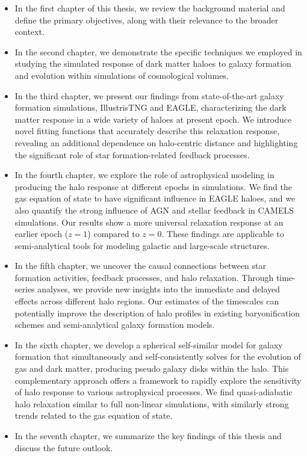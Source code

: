\begin{itemize}
    \item In the first chapter of this thesis, we review the background material and define the primary objectives, along with their relevance to the broader context.
    
    \item In the second chapter, we demonstrate the specific techniques we employed in studying the simulated response of dark matter haloes to galaxy formation and evolution within simulations of cosmological volumes.
    
    \item In the third chapter, we present our findings from state-of-the-art galaxy formation simulations, IllustrisTNG and EAGLE, characterizing the dark matter response in a wide variety of haloes at present epoch. We introduce novel fitting functions that accurately describe this relaxation response, revealing an additional dependence on halo-centric distance and highlighting the significant role of star formation-related feedback processes.
    
    \item In the fourth chapter, we explore the role of astrophysical modeling in producing the halo response at different epochs in simulations. We find the gas equation of state to have significant influence in EAGLE haloes, and we also quantify the strong influence of AGN and stellar feedback in CAMELS simulations. Our results show a more universal relaxation response at an earlier epoch ($z=1$) compared to $z=0$. These findings are applicable to semi-analytical tools for modeling galactic and large-scale structures.
    
    \item In the fifth chapter, we uncover the causal connections between star formation activities, feedback processes, and halo relaxation. Through time-series analyses, we provide new insights into the immediate and delayed effects across different halo regions. Our estimates of the timescales can potentially improve the description of halo profiles in existing baryonification schemes and semi-analytical galaxy formation models.

    \item In the sixth chapter, we develop a spherical self-similar model for galaxy formation that simultaneously and self-consistently solves for the evolution of gas and dark matter, producing pseudo galaxy disks within the halo. This complementary approach offers a framework to rapidly explore the sensitivity of halo response to various astrophysical processes. We find quasi-adiabatic halo relaxation similar to full non-linear simulations, with similarly strong trends related to the gas equation of state.

    \item In the seventh chapter, we summarize the key findings of this thesis and discuss the future outlook.
\end{itemize}